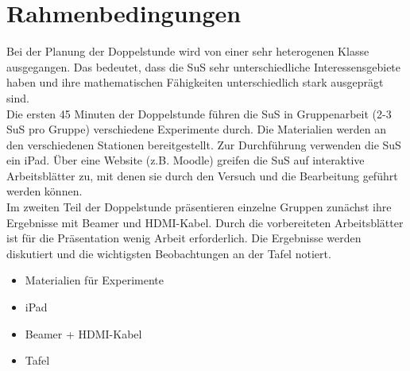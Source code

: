 \documentclass[../main.tex]{subfiles}
\begin{document}
\section{Rahmenbedingungen}
Bei der Planung der Doppelstunde wird von einer sehr heterogenen Klasse ausgegangen. Das bedeutet, dass die SuS sehr unterschiedliche Interessensgebiete haben und ihre mathematischen Fähigkeiten unterschiedlich stark ausgeprägt sind.\\
Die ersten 45 Minuten der Doppelstunde führen die SuS in Gruppenarbeit (2-3 SuS pro Gruppe) verschiedene Experimente durch. Die Materialien werden an den verschiedenen Stationen bereitgestellt. Zur Durchführung verwenden die SuS ein iPad. Über eine Website (z.B. Moodle) greifen die SuS auf interaktive Arbeitsblätter zu, mit denen sie durch den Versuch und die Bearbeitung geführt werden können.\\
Im zweiten Teil der Doppelstunde präsentieren einzelne Gruppen zunächst ihre Ergebnisse mit Beamer und HDMI-Kabel. Durch die vorbereiteten Arbeitsblätter ist für die Präsentation wenig Arbeit erforderlich. Die Ergebnisse werden diskutiert und die wichtigsten Beobachtungen an der Tafel notiert.\\
\begin{tcolorbox}[
    title= {\centering Materialien},
    title filled=false, 
    colback=white, 
    colframe=white!80!black, 
    coltitle=black, 
    arc=0pt,
    outer arc=0pt
]
\colorbox{white}{\hspace{3cm}}
\begin{minipage}{0.8\textwidth}  %
\begin{itemize}
    \item Materialien für Experimente
    \item iPad
    \item Beamer + HDMI-Kabel
    \item Tafel
\end{itemize}
\end{minipage}

\end{tcolorbox}
\end{document}
